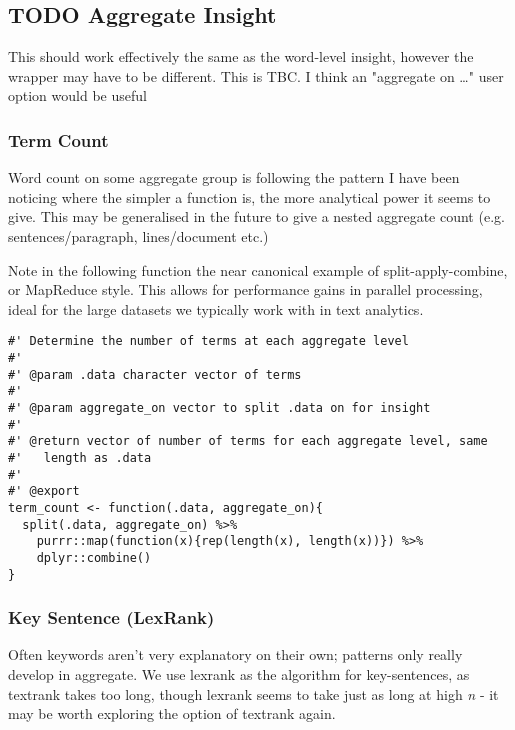 \documentclass[a4paper, 11pt]{article}
\begin{document}
\subsection{{\bfseries\sffamily TODO} Aggregate Insight}
\label{sec:org75e2484}
This should work effectively the same as the word-level insight,
however the wrapper may have to be different. This is TBC. I think an
"aggregate on \ldots{}" user option would be useful
\subsubsection{Term Count}
\label{sec:org8d2db7c}
Word count on some aggregate group is following the pattern I have
been noticing where the simpler a function is, the more analytical
power it seems to give. This may be generalised in the future to give
a nested aggregate count (e.g. sentences/paragraph, lines/document
etc.)

Note in the following function the near canonical example of
split-apply-combine, or MapReduce style. This allows for performance
gains in parallel processing, ideal for the large datasets we
typically work with in text analytics.
\begin{verbatim}
#' Determine the number of terms at each aggregate level
#'
#' @param .data character vector of terms
#'
#' @param aggregate_on vector to split .data on for insight
#'
#' @return vector of number of terms for each aggregate level, same
#'   length as .data
#'
#' @export
term_count <- function(.data, aggregate_on){
  split(.data, aggregate_on) %>%
    purrr::map(function(x){rep(length(x), length(x))}) %>%
    dplyr::combine()
}
\end{verbatim}
\subsubsection{Key Sentence (LexRank)}
\label{sec:orgac25f83}
Often keywords aren't very explanatory on their own; patterns only
really develop in aggregate. We use lexrank as the algorithm for
key-sentences, as textrank takes too long, though lexrank seems to
take just as long at high \emph{n} - it may be worth exploring the option
of textrank again.
\end{document}
